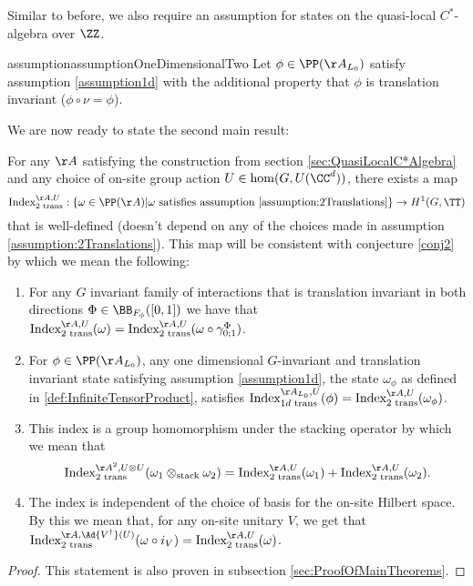 Similar to before, we also require an assumption for states on the quasi-local $C^*$-algebra over $\ZZ$.
\begin{restatable}{assumption}{assumptionOneDimensionalTwo}\label{assumption1dWithTranslation}
	Let $\phi\in\PP(\AA_{L_0})$ satisfy assumption \ref{assumption1d} with the additional property that $\phi$ is translation invariant ($\phi\circ\nu=\phi$).
\end{restatable}
We are now ready to state the second main result:
\begin{theorem}\label{thrm:ExistenceSecondIndex}
	For any $\AA$ satisfying the construction from section \ref{sec:QuasiLocalC*Algebra} and any choice of on-site group action $U\in\hom(G,U(\CC^d))$, there exists a map
	\begin{equation}
		\textrm{Index}^{\AA,U}_{2\text{ trans}}:\{\omega\in\PP(\AA)| \omega\text{ satisfies assumption \ref{assumption:2Translations}}\}\rightarrow H^1(G,\TT)
	\end{equation}
	that is well-defined (doesn't depend on any of the choices made in assumption \ref{assumption:2Translations}). This map will be consistent with conjecture \ref{conj2} by which we mean the following:
	\begin{enumerate}
		\item For any $G$ invariant family of interactions that is translation invariant in both directions $\Phi\in\BB_{F_\phi}([0,1])$ we have that $\textrm{Index}^{\AA,U}_{2\text{ trans}}(\omega)=\textrm{Index}^{\AA,U}_{2\text{ trans}}(\omega\circ\gamma^\Phi_{0;1})$.
		\item For $\phi\in\PP(\AA_{L_0})$, any one dimensional $G$-invariant and translation invariant state satisfying assumption \ref{assumption1d}, the state $\omega_\phi$ as defined in \ref{def:InfiniteTensorProduct}, satisfies $\textrm{Index}^{\AA_{L_0},U}_{1d\text{ trans}}(\phi)=\text{Index}^{\AA,U}_{2\text{ trans}}(\omega_\phi)$.
		\item This index is a group homomorphism under the stacking operator by which we mean that
		\begin{equation}
			\textrm{Index}_{\text{2 trans}}^{\AA^2,U\otimes U}(\omega_1\otimes_{\text{stack}}\omega_2)=\textrm{Index}_{\text{2 trans}}^{\AA,U}(\omega_1)+\textrm{Index}_{\text{2 trans}}^{\AA,U}(\omega_2).
		\end{equation}
		\item The index is independent of the choice of basis for the on-site Hilbert space. By this we mean that, for any on-site unitary $V$, we get that $\textrm{Index}^{\AA,\Ad{V^\dagger}(U)}_{\text{2 trans}}(\omega\circ i_V) =\textrm{Index}^{\AA,U}_{\text{2 trans}}(\omega)$.
	\end{enumerate}
\end{theorem}
\begin{proof}
	This statement is also proven in subsection \ref{sec:ProofOfMainTheorems}.
\end{proof}
